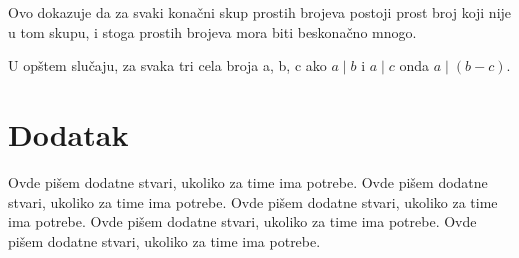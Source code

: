 \documentclass[a4paper]{article}
\begin{document}
Ovo dokazuje da za svaki konačni skup prostih brojeva postoji prost broj koji nije u tom skupu, i stoga prostih brojeva mora biti beskonačno mnogo.


\appendix

\iffalse
 

\fi

\begin{thebibliography}{9}

U opštem slučaju, za svaka tri cela broja a, b, c ako $a \mid b$ i $a \mid c$ onda $a \mid (b - c)$.


\end{thebibliography}


\appendix
\section{Dodatak}
Ovde pišem dodatne stvari, ukoliko za time ima potrebe.
Ovde pišem dodatne stvari, ukoliko za time ima potrebe.
Ovde pišem dodatne stvari, ukoliko za time ima potrebe.
Ovde pišem dodatne stvari, ukoliko za time ima potrebe.
Ovde pišem dodatne stvari, ukoliko za time ima potrebe.
\end{document}
